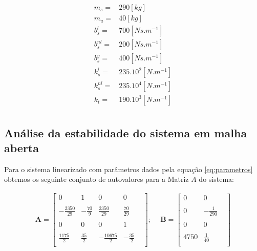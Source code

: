    \begin{equation} \label{eq:parametros}
        \begin{split} 
        m_s =   & 290     [kg]\\
        m_u =   & 40      [kg]\\
        b^{l}_s =  & 700  [Ns.m^{-1}]\\
        b^{nl}_s =  & 200      [Ns.m^{-1}]\\
        b^{y}_s=  & 400      [Ns.m^{-1}]\\
        k^{l}_s =  & 235.10^2 [N.m^{-1}]\\
        k^{nl}_s = & 235.10^4 [N.m^{-1}]\\
        k_t =  & 190.10^3 [N.m^{-1}]\\
        \end{split}
    \end{equation}

  

        \subsection{Análise da estabilidade do sistema em malha aberta}
    
    Para o sistema linearizado com parâmetros dados pela equação \ref{eq:parametros} obtemos os seguinte conjunto de autovalores para a Matriz $A$ do sistema:
    
    \begin{equation}
    \begin{split}
    \mathbf{A} =
        \begin{bmatrix}
               0&      1&        0&     0&\\ \\
               -\frac{2350}{29}& -\frac{70}{9}&  \frac{2350}{29}& \frac{70}{29}&\\ \\
               0&      0&        0&     1&\\ \\
                \frac{1175}{2}&   \frac{35}{2}& -\frac{10675}{2}& -\frac{35}{2}&\\ 
        \end{bmatrix}; \ \
    \end{split}
   \begin{split}
   \mathbf{B} =
        \begin{bmatrix}
               0&      0&\\ \\
               0& -\frac{1}{290}&\\ \\
               0&      0&\\ \\
            4750&   \frac{1}{40}&\\
        \end{bmatrix}
   \end{split}     
    \end{equation}
    

